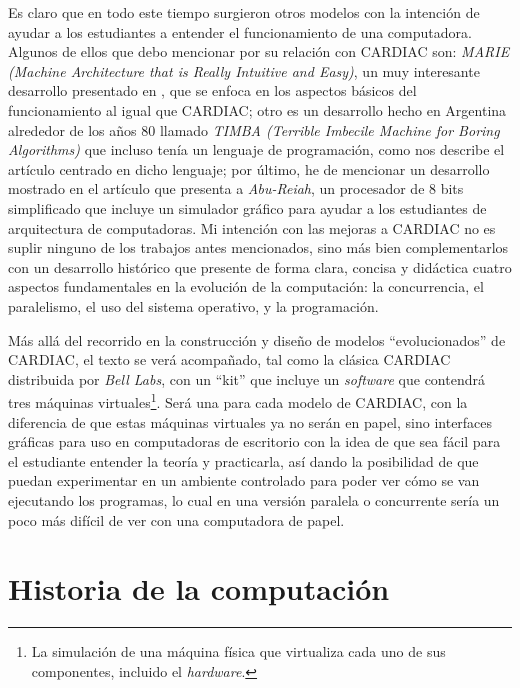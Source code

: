 \documentclass[letterpaper,12pt,oneside]{book}
\begin{document}
	Es claro que en todo este tiempo surgieron otros modelos con la intención de ayudar a los estudiantes a entender el funcionamiento de una computadora. Algunos
	de ellos que debo mencionar por su relación con CARDIAC son: \textit{MARIE (Machine Architecture that is Really Intuitive and Easy)}, un muy interesante 
	desarrollo presentado en \cite{null_essentials_2003}, que se enfoca en los aspectos básicos del funcionamiento al igual que CARDIAC; otro es un desarrollo
	hecho en Argentina alrededor de los años 80 llamado \textit{TIMBA (Terrible Imbecile Machine for Boring Algorithms)} que incluso tenía un lenguaje de programación,
	como nos describe el artículo \cite{alvaro_frias_retruco_2022} centrado en dicho lenguaje; por último, he de mencionar un desarrollo
	mostrado en el artículo \cite{ajdari_design_2012} que presenta a \textit{Abu-Reiah}, un procesador de 8 bits simplificado que incluye un simulador 
	gráfico
	para ayudar a los estudiantes de arquitectura de computadoras. Mi intención con las mejoras a CARDIAC no es suplir ninguno de los trabajos antes mencionados,
	sino más bien complementarlos con un desarrollo histórico que presente de forma clara, concisa y didáctica cuatro aspectos fundamentales en la evolución
	de la computación: la concurrencia, el paralelismo, el uso del sistema operativo, y la programación.
	
	
	Más allá del recorrido en la construcción y diseño de modelos ``evolucionados'' de CARDIAC, el texto se verá acompañado,
	tal como la clásica CARDIAC distribuida por \textit{Bell Labs}, con un ``kit'' que incluye un \textit{software} que contendrá tres máquinas virtuales\footnote{La simulación de una
	máquina física que virtualiza cada uno de sus componentes, incluido el \textit{hardware}.}. Será una para cada
	modelo de CARDIAC, con la diferencia de que estas máquinas virtuales ya no serán en papel, sino interfaces gráficas para uso en computadoras de escritorio con la idea de 
	que sea fácil para el estudiante
	entender la teoría y practicarla, así dando la posibilidad de que puedan experimentar en un ambiente controlado para poder ver cómo se van ejecutando los programas, lo cual en una versión paralela o concurrente sería un poco más difícil de ver con una 
	computadora de papel.

	

\tableofcontents
\listoffigures

\mainmatter

\chapter{Historia de la computación} 
\end{document}
